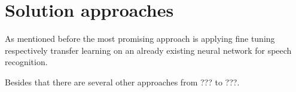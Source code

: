 \chapter{Solution approaches}
\label{solution}
As mentioned before the most promising approach is applying fine tuning respectively transfer learning on an already existing neural network for speech recognition.

Besides that there are several other approaches from ??? to ???.


